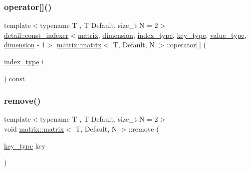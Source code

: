 \subsubsection{\texorpdfstring{operator[]()}{operator[]()}\hspace{0.1cm}{\footnotesize\ttfamily [2/2]}}
{\footnotesize\ttfamily template$<$typename T , T Default, size\+\_\+t N = 2$>$ \\
\hyperlink{structmatrix_1_1detail_1_1const__indexer}{detail\+::const\+\_\+indexer}$<$\hyperlink{structmatrix_1_1matrix}{matrix}, \hyperlink{structmatrix_1_1matrix_a7d76bd51fd998974f59ea4035e053f74}{dimension}, \hyperlink{structmatrix_1_1matrix_a87b61e7f35dcd5991cd3f243cfeced06}{index\+\_\+type}, \hyperlink{structmatrix_1_1matrix_af7b5498ac1b615cb9ef51bd185a2557e}{key\+\_\+type}, \hyperlink{structmatrix_1_1matrix_ab940e7a84942339cdee7c0f0d3bd8ef9}{value\+\_\+type}, \hyperlink{structmatrix_1_1matrix_a7d76bd51fd998974f59ea4035e053f74}{dimension} -\/ 1$>$ \hyperlink{structmatrix_1_1matrix}{matrix\+::matrix}$<$ T, Default, N $>$\+::operator\mbox{[}$\,$\mbox{]} (\begin{DoxyParamCaption}\item[{\hyperlink{structmatrix_1_1matrix_a87b61e7f35dcd5991cd3f243cfeced06}{index\+\_\+type}}]{i }\end{DoxyParamCaption}) const\hspace{0.3cm}{\ttfamily [inline]}}

\mbox{\label{structmatrix_1_1matrix_ac15f926245fe20e9dfee3f0695299550}} 
\subsubsection{\texorpdfstring{remove()}{remove()}}
{\footnotesize\ttfamily template$<$typename T , T Default, size\+\_\+t N = 2$>$ \\
void \hyperlink{structmatrix_1_1matrix}{matrix\+::matrix}$<$ T, Default, N $>$\+::remove (\begin{DoxyParamCaption}\item[{\hyperlink{structmatrix_1_1matrix_af7b5498ac1b615cb9ef51bd185a2557e}{key\+\_\+type}}]{key }\end{DoxyParamCaption})\hspace{0.3cm}{\ttfamily [inline]}}

\mbox{\label{structmatrix_1_1matrix_aec0384fc656feed77a2c71c2ed0065d8}} 
